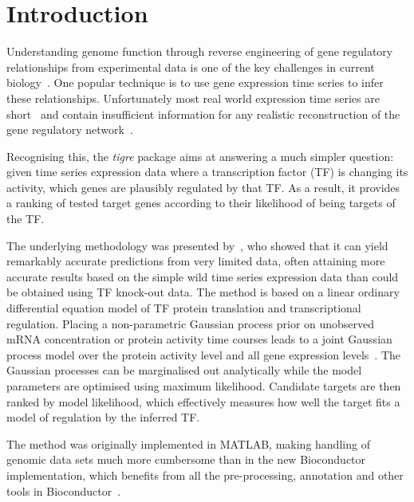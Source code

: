 \documentclass{bioinfo}
\newcommand{\tigre}{\emph{tigre}}
\begin{document}
\section{Introduction}

Understanding genome function through reverse engineering of gene
regulatory relationships from experimental data is one of the key
challenges in current biology~\citep{Bansal2007a,Bickel2009e}.  One
popular technique is to use gene expression time series to infer these
relationships.  Unfortunately most real world expression time series
are short~\citep{Ernst2005} and contain insufficient information for
any realistic reconstruction of the gene regulatory
network~\citep{Smet2010}.

Recognising this, the \tigre{} package aims at answering a much
simpler question: given time series expression data where a
transcription factor (TF) is changing its activity, which genes are
plausibly regulated by that TF.  As a result, it provides a ranking of
tested target genes according to their likelihood of being targets of
the TF.

The underlying methodology was presented by~\citet{Honkela2010PNAS},
who showed that it can yield remarkably accurate predictions from very
limited data, often attaining more accurate results based on the
simple wild time series expression data than could be obtained using
TF knock-out data.  The method is based on a linear ordinary
differential equation model of TF protein translation and
transcriptional regulation.  Placing a non-parametric Gaussian process
prior on unobserved mRNA concentration or protein activity time courses
leads to a
joint Gaussian process model over the protein activity level and all
gene expression levels~\citep{Gao2008}.  The Gaussian processes can be
marginalised out analytically while the model parameters are optimised
using maximum likelihood.  Candidate targets are then ranked by model
likelihood, which effectively measures how well the target fits a
model of regulation by the inferred TF.

The method was originally implemented in MATLAB,
making handling of genomic data sets much more cumbersome than in the
new Bioconductor implementation, which benefits from all the
pre-processing, annotation and other tools in
Bioconductor~\citep{Gentleman2004}.

\end{document}
